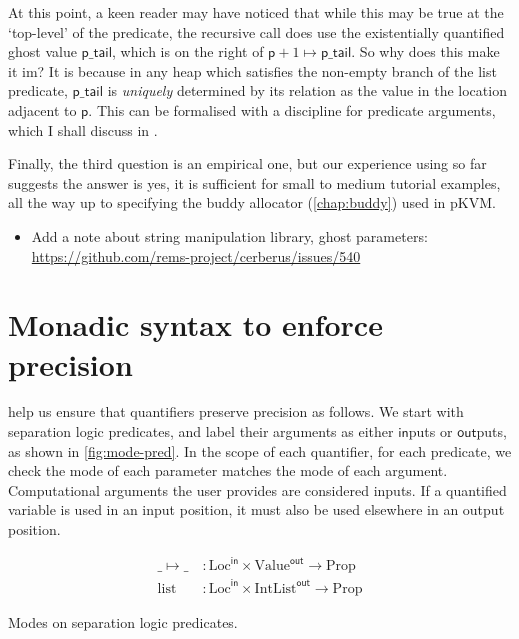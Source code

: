 At this point, a keen reader may have noticed that while this may be true at
the `top-level' of the predicate, the recursive call does use the existentially
quantified ghost value $\mathsf{p\_tail}$, which is on the right of $\mathsf{p}
+ 1 \mapsto{} \mathsf{p\_tail}$. So why does this make it im? It is
because in any heap which satisfies the non-empty branch of the list
predicate, $\mathsf{p\_tail}$ is \emph{uniquely} determined by its relation as
the value in the location adjacent to $\mathsf{p}$. This can be formalised with a 
discipline for predicate arguments, which I shall discuss in
.

Finally, the third question is an empirical one, but our experience using
 so far~ suggests the answer is
yes, it is sufficient for small to medium tutorial examples, all the way up to
specifying the buddy allocator (\cref{chap:buddy}) used in pKVM\@.

\begin{itemize}
    \item Add a note about string manipulation library, ghost parameters:
        \url{https://github.com/rems-project/cerberus/issues/540}
\end{itemize}

\section{Monadic syntax to enforce precision}\label{sec:monadic-syntax}

 help us ensure that quantifiers preserve precision as
follows. We start with separation logic predicates, and label their arguments
as either $\mathsf{in}$puts or $\mathsf{out}$puts, as shown in
\cref{fig:mode-pred}. In the scope of each quantifier, for each predicate, we
check the mode of each parameter matches the mode of each argument.
Computational arguments the user provides are considered inputs. If a quantified
variable is used in an input position, it must also be used elsewhere in an
output position.

\begin{marginfigure}
    \centering
    \begin{align*}
        \_ \mapsto{} \_ \:&: \mathrm{Loc}^{\mathsf{in}} \times \mathrm{Value}^{\mathsf{out}} \rightarrow \mathrm{Prop} \\
        \mathrm{list} \:&: \mathrm{Loc}^{\mathsf{in}} \times \mathrm{IntList}^{\mathsf{out}} \rightarrow \mathrm{Prop}
    \end{align*}
    \caption{Modes on separation logic predicates.}\label{fig:mode-pred}
\end{marginfigure}

